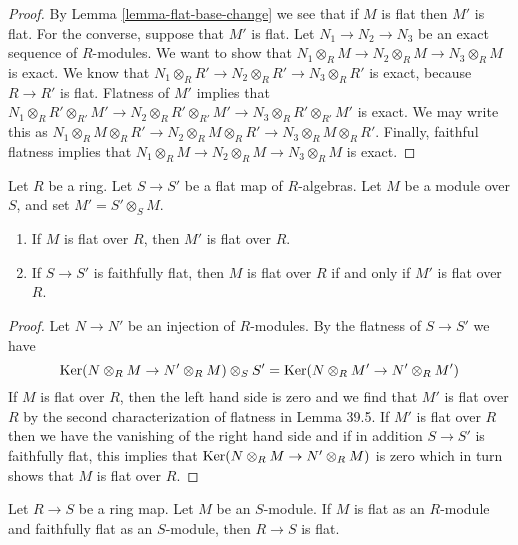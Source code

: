 \begin{proof}
	By Lemma \ref{lemma-flat-base-change} we see that if $M$ is flat
	then $M'$ is flat. For the converse, suppose that $M'$ is flat.
	Let $N_1 \to N_2 \to N_3$ be an exact sequence of $R$-modules.
	We want to show that $N_1 \otimes_R M \to N_2 \otimes_R M \to N_3 \otimes_R M$
	is exact. We know that
	$N_1 \otimes_R R' \to N_2 \otimes_R R' \to N_3 \otimes_R R'$ is
	exact, because $R \to R'$ is flat. Flatness of $M'$ implies that
	$N_1 \otimes_R R' \otimes_{R'} M'
	\to N_2 \otimes_R R' \otimes_{R'} M'
	\to N_3 \otimes_R R' \otimes_{R'} M'$ is exact.
	We may write this as
	$N_1 \otimes_R M \otimes_R R'
	\to N_2 \otimes_R M \otimes_R R'
	\to N_3 \otimes_R M \otimes_R R'$.
	Finally, faithful flatness implies that
	$N_1 \otimes_R M \to N_2 \otimes_R M \to N_3 \otimes_R M$
	is exact.
\end{proof}

\begin{lemma}\cite[\href{https://stacks.math.columbia.edu/tag/0584}{Lemma 0584}]{stacks-project}
	\label{lemma-flatness-descends-more-general}
	Let $R$ be a ring. Let $S \to S'$ be a flat map of $R$-algebras.
	Let $M$ be a module over $S$, and set $M' = S' \otimes_S M$.
	\begin{enumerate}
		\item If $M$ is flat over $R$, then $M'$ is flat over $R$.
		\item If $S \to S'$ is faithfully flat, then $M$ is flat
		over $R$ if and only if $M'$ is flat over $R$.
	\end{enumerate}
\end{lemma}

\begin{proof}
	Let $N \to N'$ be an injection of $R$-modules. By the flatness
	of $S \to S'$ we have
	$$
	\mathop{\mathrm{Ker}}(N \otimes_R M \to N' \otimes_R M) \otimes_S S'
	=
	\mathop{\mathrm{Ker}}(N \otimes_R M' \to N' \otimes_R M')
	$$
	If $M$ is flat over $R$, then the left hand side is zero and
	we find that $M'$ is flat over $R$ by the second characterization
	of flatness in Lemma 39.5.
	If $M'$ is flat over $R$ then we have the vanishing of the right hand side
	and if in addition $S \to S'$ is faithfully flat, this implies that
	$\mathop{\mathrm{Ker}}(N \otimes_R M \to N' \otimes_R M)$ is zero which in turn
	shows that $M$ is flat over $R$.
\end{proof}

\begin{lemma}\cite[\href{https://stacks.math.columbia.edu/tag/039V}{Lemma 039V}]{stacks-project}
	\label{lemma-flat-permanence}
	Let $R \to S$ be a ring map. Let $M$ be an $S$-module.
	If $M$ is flat as an $R$-module and faithfully flat as an $S$-module,
	then $R \to S$ is flat.
\end{lemma}

